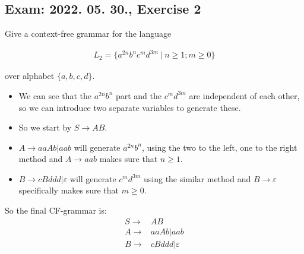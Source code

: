 \subsection{Exam: 2022. 05. 30., Exercise 2}


Give a context-free grammar for the language

\begin{align*}
L_2 = \{a^{2n}b^{n}c^{m}d^{3m} ~|~ n\geq{}1; m\geq{}0\}
\end{align*}

over alphabet $\{a,b,c,d\}$.


\begin{itemize}
    \item We can see that the $a^{2n}b^{n}$ part and the $c^{m}d^{3m}$ are independent of each other, so we can introduce two separate variables to generate these.
    \item So we start by $S\rightarrow{}AB$.
    \item $A\rightarrow{}aaAb|aab$ will generate $a^{2n}b^{n}$, using the two to the left, one to the right method and $A\rightarrow{}aab$ makes sure that $n\geq{}1$.
    \item $B\rightarrow{}cBddd|\varepsilon{}$ will generate $c^{m}d^{3m}$ using the similar method and $B\rightarrow{}\varepsilon{}$ specifically makes sure that $m\geq{}0$.
\end{itemize}

So the final CF-grammar is:
\begin{align*}
S\rightarrow{}&AB\\
A\rightarrow{}&aaAb|aab\\
B\rightarrow{}&cBddd|\varepsilon{}
\end{align*}

